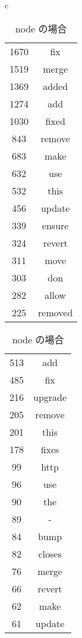 \documentclass{jarticle}
\begin{document}
\begin{table}[htbp]
 \begin{center}
  \begin{tabular}{c}

   \begin{minipage}{0.3\hsize}
    \begin{center}
     \caption{rails の場合}
     \begin{tabular}{c|c}
      \hline
      1670 & fix \\
      1519 & merge \\
      1369 & added \\
      1274 & add \\
      1030 & fixed \\
      843 & remove \\
      683 & make \\
      632 & use \\
      532 & this \\
      456 & update \\
      339 & ensure \\
      324 & revert \\
      311 & move \\
      303 & don \\
      282 & allow \\
      225 & removed \\
      \hline
     \end{tabular}
    \end{center}
   \end{minipage}

   \begin{minipage}{0.3\hsize}
    \begin{center}
     \caption{node の場合}
     \begin{tabular}{c|c}
      \hline
      513 & add \\
      485 & fix \\
      216 & upgrade \\
      205 & remove \\
      201 & this \\
      178 & fixes \\
      99 & http \\
      96 & use \\
      90 & the \\
      89 & - \\
      84 & bump \\
      82 & closes \\
      76 & merge \\
      66 & revert \\
      62 & make \\
      61 & update \\
      \hline
     \end{tabular}
    \end{center}
   \end{minipage}



\end{tabular}
\end{center}
\end{table}
\end{document}
